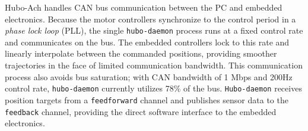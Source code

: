 
Hubo-Ach handles CAN bus communication between the PC and embedded
electronics.  Because the motor controllers synchronize to the control
period in a \emph{phase lock loop} (PLL), the single {\tt hubo-daemon}
process runs at a fixed control rate and communicates on the bus.  The
embedded controllers lock to this rate and linearly interpolate
between the commanded positions, providing smoother trajectories in
the face of limited communication bandwidth.  This communication
process also avoids bus saturation; with CAN bandwidth of 1 Mbps and
200Hz control rate, {\tt hubo-daemon} currently utilizes 78\% of the
bus.  {\tt Hubo-daemon} receives position targets from a
{\tt feedforward} channel and publishes sensor data to the
{\tt feedback} channel, providing the direct software interface to
the embedded electronics.



